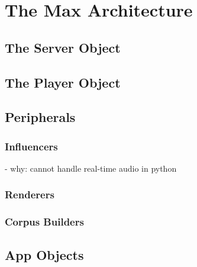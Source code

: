 \chapter{The Max Architecture}\label{sec:3-max-architecture}


\section{The Server Object}\label{ssec:3-server}

\section{The Player Object}\label{ssec:3-player}

\section{Peripherals}\label{ssec:3-peripherals}

\subsection{Influencers}\label{ssec:3-influencers}
- why: cannot handle real-time audio in python

\subsection{Renderers}\label{ssec:3-renderers}

\subsection{Corpus Builders}\label{ssec:3-corpusbuilders}

\section{App Objects}\label{ssec:3-app-objects}
